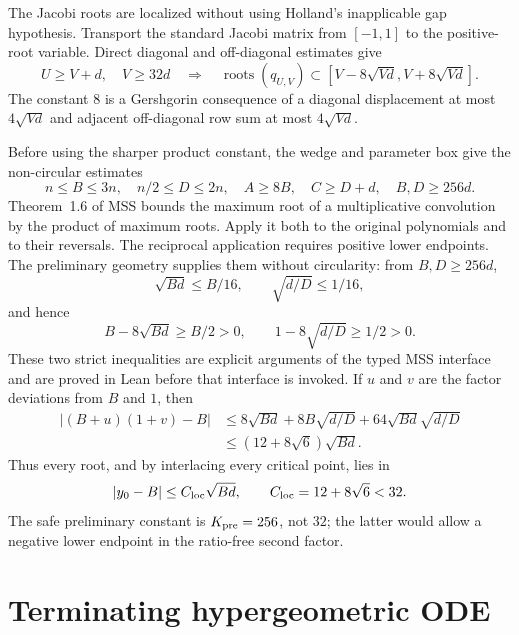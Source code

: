 \documentclass[12pt]{article}
\begin{document}
The Jacobi roots are localized without using Holland's inapplicable gap
hypothesis.  Transport the standard Jacobi matrix from $[-1,1]$ to the
positive-root variable.  Direct diagonal and off-diagonal estimates give
\begin{equation}\label{eq:jacobi-local}
 U\ge V+d,\quad V\ge32d
 \quad\Longrightarrow\quad
 \operatorname{roots}(q_{U,V})\subset
 [V-8\sqrt{Vd},V+8\sqrt{Vd}].
\end{equation}
The constant $8$ is a Gershgorin consequence of a diagonal displacement at
most $4\sqrt{Vd}$ and adjacent off-diagonal row sum at most
$4\sqrt{Vd}$.

Before using the sharper product constant, the wedge and parameter box give
the non-circular estimates
\begin{equation}\label{eq:coarse-parameter}
 n\le B\le3n,\quad n/2\le D\le2n,\quad
 A\ge8B,\quad C\ge D+d,\quad B,D\ge256d.
\end{equation}
Theorem~1.6 of MSS bounds the maximum root of a multiplicative convolution
by the product of maximum roots.  Apply it both to the original polynomials
and to their reversals.  The reciprocal application requires positive lower
endpoints.  The preliminary geometry supplies them without circularity:
from $B,D\ge256d$,
\[
 \sqrt{Bd}\le B/16,\qquad \sqrt{d/D}\le1/16,
\]
and hence
\[
 B-8\sqrt{Bd}\ge B/2>0,\qquad
 1-8\sqrt{d/D}\ge1/2>0.
\]
These two strict inequalities are explicit arguments of the typed MSS
interface and are proved in Lean before that interface is invoked.  If $u$
and $v$ are the factor deviations from $B$
and $1$, then
\begin{align}
 |(B+u)(1+v)-B|
 &\le8\sqrt{Bd}+8B\sqrt{d/D}
       +64\sqrt{Bd}\sqrt{d/D}\nonumber\\
 &\le(12+8\sqrt6)\sqrt{Bd}.
 \label{eq:product-localization}
\end{align}
Thus every root, and by interlacing every critical point, lies in
\begin{equation}\label{eq:localization}
 |y_0-B|\le C_{\rm loc}\sqrt{Bd},\qquad
 C_{\rm loc}=12+8\sqrt6<32.
\end{equation}
The safe preliminary constant is $K_{\rm pre}=256$, not $32$; the latter
would allow a negative lower endpoint in the ratio-free second factor.

\section{Terminating hypergeometric ODE}\label{sec:ode}
\end{document}

